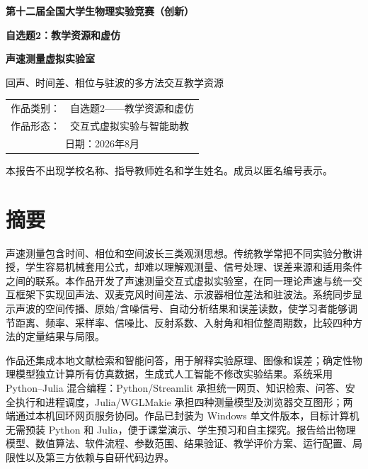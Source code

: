 \documentclass[UTF8,a4paper,zihao=-4]{ctexart}
\begin{document}
\hypersetup{pageanchor=false}
\begin{titlepage}
\thispagestyle{empty}
  \centering
  \vspace*{1.5cm}
  {\bfseries 第十二届全国大学生物理实验竞赛（创新）\par}
  \vspace{0.8cm}
  {\bfseries 自选题2：教学资源和虚仿\par}
  \vspace{1.8cm}
  {\bfseries 声速测量虚拟实验室\par}
  \vspace{0.4cm}
  {回声、时间差、相位与驻波的多方法交互教学资源\par}
  \vfill
  \begin{tabular}{rl}
    作品类别：& 自选题2——教学资源和虚仿\\
    作品形态：& 交互式虚拟实验与智能助教\\
    \multicolumn{2}{c}{日期：\quad 2026年8月}
  \end{tabular}
  \vfill
  {\small 本报告不出现学校名称、指导教师姓名和学生姓名。成员以匿名编号表示。}
\end{titlepage}
\hypersetup{pageanchor=true}

\section*{摘要}
\begin{sloppypar}
声速测量包含时间、相位和空间波长三类观测思想。传统教学常把不同实验分散讲授，学生容易机械套用公式，却难以理解观测量、信号处理、误差来源和适用条件之间的联系。本作品开发了声速测量交互式虚拟实验室，在同一理论声速与统一交互框架下实现回声法、双麦克风时间差法、示波器相位差法和驻波法。系统同步显示声波的空间传播、原始/含噪信号、自动分析结果和误差读数，使学习者能够调节距离、频率、采样率、信噪比、反射系数、入射角和相位整周期数，比较四种方法的定量结果与局限。

作品还集成本地文献检索和智能问答，用于解释实验原理、图像和误差；确定性物理模型独立计算所有仿真数据，生成式人工智能不修改实验结果。系统采用 Python--Julia 混合编程：Python/Streamlit 承担统一网页、知识检索、问答、安全执行和进程调度，Julia/WGLMakie 承担四种测量模型及浏览器交互图形；两端通过本机回环网页服务协同。作品已封装为 Windows 单文件版本，目标计算机无需预装 Python 和 Julia，便于课堂演示、学生预习和自主探究。报告给出物理模型、数值算法、软件流程、参数范围、结果验证、教学评价方案、运行配置、局限性以及第三方依赖与自研代码边界。
\end{sloppypar}
\end{document}
